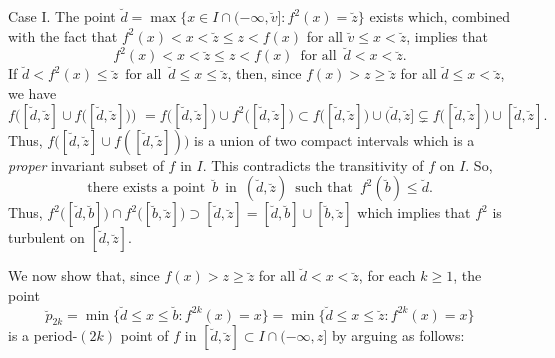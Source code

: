 \documentclass[12pt]{article}
\begin{document}
Case I.  The point $\breve d = \max \big\{ x \in I \cap (-\infty, \breve v] : f^2(x) = \breve z \big\}$ exists which, combined with the fact that $f^2(x) < x < \breve z \le z < f(x)$ for all $\breve v \le x < \breve z$, implies that 
$$
f^2(x) < x < \breve z \le z < f(x) \,\,\, \text{for all} \,\,\, \breve d < x < \breve z.
$$  
If $\breve d < f^2(x) \le \breve z \,\,\, \text{for all} \,\,\, \breve d \le x \le \breve z$, 
then, since $f(x) > z \ge \breve z$ for all $\breve d \le x < \breve z$, we have
$$
f\Big([\breve d, \breve z] \cup f\big([\breve d, \breve z]\big)\Big) \,\,= f\big([\breve d, \breve z]\big) \cup f^2\bigl([\breve d, \breve z]\big) \subset f\big([\breve d, \breve z]\big) \cup (\breve d, \breve z] \subsetneq f\big([\breve d, \breve z]\big) \cup [\breve d, \breve z].
$$  
Thus, $f\big([\breve d, \breve z] \cup f([\breve d, \tilde z])\big)$ is a union of two compact intervals which is a {\it proper} invariant subset of $f$ in $I$.  This contradicts the transitivity of $f$ on $I$.  So, $$\text{there exists a point} \,\,\, \breve b \,\,\, \text{in} \,\,\, (\breve d, \breve z) \,\,\, \text{such that} \,\,\, f^2(\breve b) \le \breve d.$$  
Thus, $f^2\bigl([\breve d, \breve b]\bigr) \cap f^2\bigl([\breve b, \breve z]\bigr) \supset [\breve d, \breve z] = [\breve d, \breve b] \cup [\breve b, \breve z]$ which implies that $f^2$ is turbulent on $[\breve d, \breve z]$.  

We now show that, since $f(x) > z \ge \breve z$ for all $\breve d < x < \breve z$, for each $k \ge 1$, the point 
$$
\breve p_{2k} = \min \big\{ \breve d \le x \le \breve b : f^{2k}(x) = x \big\} = \min \big\{ \breve d \le x \le \breve z : f^{2k}(x) = x \big\}
$$ 
is a period-$(2k)$ point of $f$ in $[\breve d, \breve z] \subset I \cap (-\infty, z]$ by arguing as follows:
\end{document}
